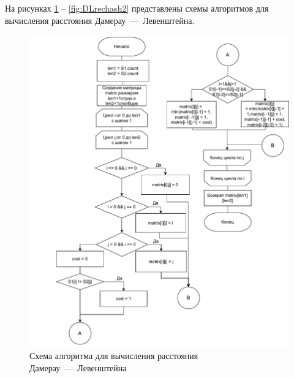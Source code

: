 На рисунках \ref{fig:DLiter} -- \ref{fig:DLrechash2} представлены схемы алгоритмов для вычисления расстояния Дамерау~---~Левенштейна. 

\begin{figure}[h]
	\centering
	\includegraphics[height=0.8\textheight]{img/DLevenshtein.pdf}
	\caption{Схема алгоритма для вычисления расстояния Дамерау~---~Левенштейна}
	\label{fig:DLiter}
\end{figure}

\clearpage

